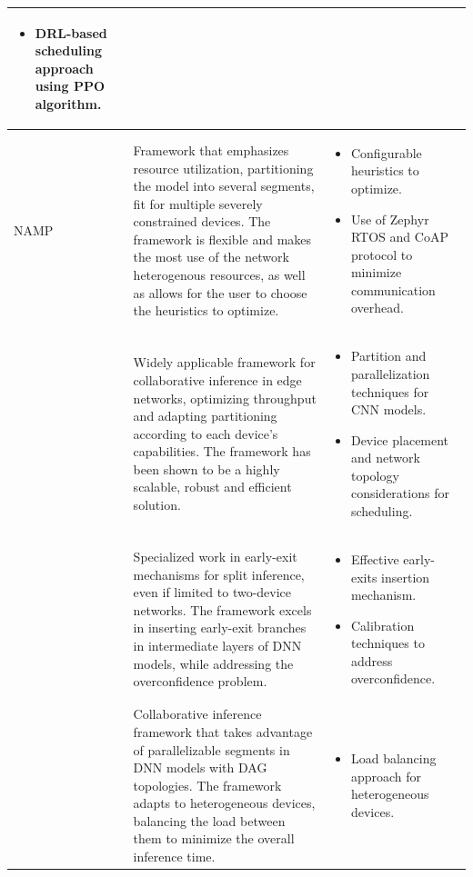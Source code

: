\begin{xltabular}{\textwidth}{|m{2.4cm}|X|X|}
\begin{itemize}[noitemsep, topsep=0pt, leftmargin=*]
        \item \ac{DRL}-based scheduling approach using \ac{PPO} algorithm.
    \end{itemize}
\\
\hline
NAMP \cite{rego::namp}
&
    Framework that emphasizes resource utilization, partitioning the model into
    several segments, fit for multiple severely constrained devices. The framework 
    is flexible and makes the most use of the network heterogenous resources,
    as well as allows for the user to choose the heuristics to optimize.
&
    \begin{itemize}[noitemsep, topsep=0pt, leftmargin=*]
        \item Configurable heuristics to optimize.
        \item Use of Zephyr RTOS and CoAP protocol to minimize communication overhead.
    \end{itemize}
\\
\hline
\textcite{p_dai_joint_2025} 
& 
    Widely applicable framework for collaborative inference in edge networks,
    optimizing throughput and adapting partitioning according to each device's 
    capabilities. The framework has been shown to be a highly scalable,
    robust and efficient solution.
& 
    \begin{itemize}[noitemsep, topsep=0pt, leftmargin=*]
        \item Partition and parallelization techniques for \ac{CNN} models.
        \item Device placement and network topology considerations for scheduling. 
    \end{itemize}
\\
\hline

\textcite{r_g_pacheco_calibration-aided_2021}
&
    Specialized work in early-exit mechanisms for split inference,
    even if limited to two-device networks. The framework excels in
    inserting early-exit branches in intermediate layers of \ac{DNN}
    models, while addressing the overconfidence problem.
&
    \begin{itemize}[noitemsep, topsep=0pt, leftmargin=*]
        \item Effective early-exits insertion mechanism.
        \item Calibration techniques to address overconfidence.
    \end{itemize}
\\
\hline

\textcite{w_miao_adaptive_2020} 
& 
    Collaborative inference framework that takes advantage of parallelizable
    segments in \ac{DNN} models with \ac{DAG} topologies. The framework
    adapts to heterogeneous devices, balancing the load between them to
    minimize the overall inference time.
& 
    \begin{itemize}[noitemsep, topsep=0pt, leftmargin=*]
        \item Load balancing approach for heterogeneous devices.
    \end{itemize}
\\
\hline
\end{xltabular}
